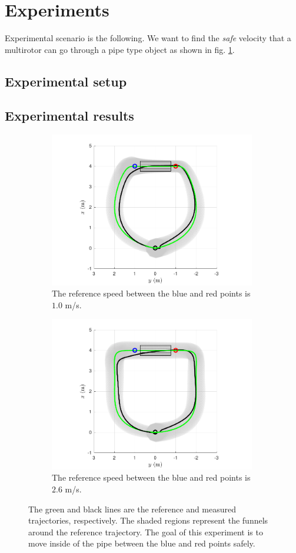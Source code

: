\documentclass[letterpaper, 10 pt, conference]{ieeeconf}  %
\begin{document}
\section{Experiments}
Experimental scenario is the following. 
We want to find the \textit{safe} velocity that a multirotor can go through a pipe type object as shown in fig. \ref{fig:experimentalResult}.

\subsection{Experimental setup}
\subsection{Experimental results}
\begin{figure}[!h]
\begin{subfigure}[b]{0.5\textwidth}
\centering
\includegraphics[width=9.0cm]{slow.pdf}
\caption{The reference speed between the blue and red points is $1.0$ m/s.}
\end{subfigure}
\begin{subfigure}[b]{0.5\textwidth}
\centering
\includegraphics[width=9.0cm]{fast.pdf}
\caption{The reference speed between the blue and red points is $2.6$ m/s.}
\end{subfigure}
\caption{The green and black lines are the reference and measured trajectories, respectively. The shaded regions represent the funnels around the reference trajectory. The goal of this experiment is to move inside of the pipe between the blue and red points safely.}
\label{fig:experimentalResult}
\end{figure}
\end{document}
